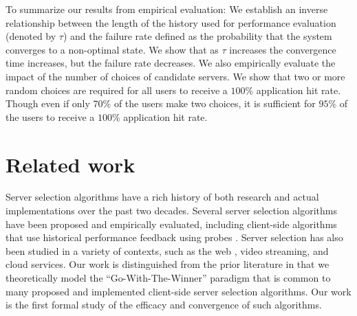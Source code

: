 \documentclass[conference]{IEEEtran}
\begin{document}
To summarize our results from empirical evaluation: We establish an inverse relationship between the length of the history used for performance evaluation (denoted by  $\tau$) and the failure rate defined as the probability that the system converges to a non-optimal state. We show that as $\tau$ increases the convergence time increases, but the failure rate decreases. We  also empirically evaluate the impact of the number of choices of candidate servers. We show that two or more random choices are required for all users to receive a $100\%$ application hit rate. Though even if only  70\% of the users  make two choices,  it is sufficient for $95\%$  of the users to receive a $100\%$ application hit rate. 



\section{Related work}
Server selection algorithms have a rich history of both research and actual implementations over the past two decades. Several server selection algorithms have been proposed and empirically evaluated, including client-side algorithms that use historical performance feedback using probes \cite{dykes2000empirical,crovella1995dynamic}.  Server selection has also been studied in a variety of contexts, such as  the web \cite{crovella1995dynamic,sayal1998selection}, video streaming\cite{torres2011dissecting}, and cloud services\cite{wendell2010donar}. Our work is distinguished from the prior literature in that we theoretically model the ``Go-With-The-Winner'' paradigm that is common to many proposed and implemented client-side server selection algorithms. Our work is the first formal study of the efficacy and convergence of such algorithms.
\end{document}
